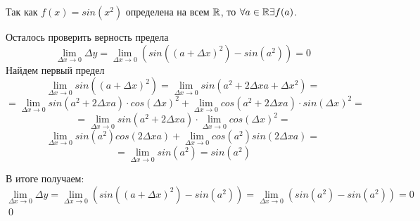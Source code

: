 Так как $f(x) = sin(x^2)$ определена на всем $\mathbb{R}$, то $\forall a \in \mathbb{R} \exists f(a)$.

Осталось проверить верность предела
\[
\lim_{\Delta x \rightarrow 0} \Delta y = \lim_{\Delta x \rightarrow 0}( sin((a + \Delta x)^2) - sin(a^2)) = 0
\]
Найдем первый предел
\[
\lim_{\Delta x \rightarrow 0} sin((a + \Delta x)^2)
=
\lim_{\Delta x \rightarrow 0} sin(a^2 + 2\Delta xa + \Delta x^2) =
\]
\[
=
\lim_{\Delta x \rightarrow 0} sin(a^2 + 2\Delta xa) \cdot cos(\Delta x)^2
+
\lim_{\Delta x \rightarrow 0} cos(a^2 + 2\Delta xa) \cdot sin(\Delta x)^2
=\]
\[
=
\lim_{\Delta x \rightarrow 0} sin(a^2 + 2\Delta xa) \cdot \lim_{\Delta x \rightarrow 0} cos(\Delta x)^2
=
\]
\[
\lim_{\Delta x \rightarrow 0} sin(a^2)cos(2\Delta xa)
+
\lim_{\Delta x \rightarrow 0} cos(a^2)sin(2\Delta xa)
=
\]
\[
=
\lim_{\Delta x \rightarrow 0} sin(a^2) = sin(a^2)
\]

В итоге получаем:
\[
\lim_{\Delta x \rightarrow 0} \Delta y = \lim_{\Delta x \rightarrow 0}( sin((a + \Delta x)^2) - sin(a^2)) = \lim_{\Delta x \rightarrow 0}( sin(a^2) - sin(a^2)) = 0
\]
\qed